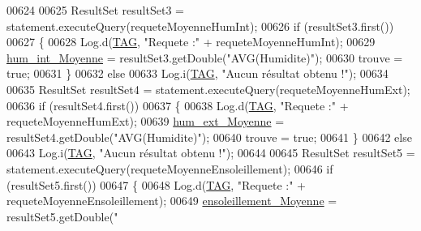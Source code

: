 \begin{DoxyCode}
00624 
00625                         ResultSet resultSet3 = statement.executeQuery(requeteMoyenneHumInt);
00626                         \textcolor{keywordflow}{if} (resultSet3.first())
00627                         \{
00628                             Log.d(\hyperlink{classfr_1_1campus_1_1laurainc_1_1honeybee_1_1_ruche_a44739cbb0fa7451c1edc240a3f51c257}{TAG}, \textcolor{stringliteral}{"Requete :"} + requeteMoyenneHumInt);
00629                             \hyperlink{classfr_1_1campus_1_1laurainc_1_1honeybee_1_1_ruche_a8edae192f1f8c4578d321f4b2129cc8a}{hum\_int\_Moyenne} = resultSet3.getDouble(\textcolor{stringliteral}{"AVG(Humidite)"});
00630                             trouve = \textcolor{keyword}{true};
00631                         \}
00632                         \textcolor{keywordflow}{else}
00633                             Log.i(\hyperlink{classfr_1_1campus_1_1laurainc_1_1honeybee_1_1_ruche_a44739cbb0fa7451c1edc240a3f51c257}{TAG}, \textcolor{stringliteral}{"Aucun résultat obtenu !"});
00634 
00635                         ResultSet resultSet4 = statement.executeQuery(requeteMoyenneHumExt);
00636                         \textcolor{keywordflow}{if} (resultSet4.first())
00637                         \{
00638                             Log.d(\hyperlink{classfr_1_1campus_1_1laurainc_1_1honeybee_1_1_ruche_a44739cbb0fa7451c1edc240a3f51c257}{TAG}, \textcolor{stringliteral}{"Requete :"} + requeteMoyenneHumExt);
00639                             \hyperlink{classfr_1_1campus_1_1laurainc_1_1honeybee_1_1_ruche_ad1f2d0608c7cbb7689254ef4ee70942a}{hum\_ext\_Moyenne} = resultSet4.getDouble(\textcolor{stringliteral}{"AVG(Humidite)"});
00640                             trouve = \textcolor{keyword}{true};
00641                         \}
00642                         \textcolor{keywordflow}{else}
00643                             Log.i(\hyperlink{classfr_1_1campus_1_1laurainc_1_1honeybee_1_1_ruche_a44739cbb0fa7451c1edc240a3f51c257}{TAG}, \textcolor{stringliteral}{"Aucun résultat obtenu !"});
00644 
00645                         ResultSet resultSet5 = statement.executeQuery(requeteMoyenneEnsoleillement);
00646                         \textcolor{keywordflow}{if} (resultSet5.first())
00647                         \{
00648                             Log.d(\hyperlink{classfr_1_1campus_1_1laurainc_1_1honeybee_1_1_ruche_a44739cbb0fa7451c1edc240a3f51c257}{TAG}, \textcolor{stringliteral}{"Requete :"} + requeteMoyenneEnsoleillement);
00649                             \hyperlink{classfr_1_1campus_1_1laurainc_1_1honeybee_1_1_ruche_af3da6a0f98d377ec6633f40a8c0e5c99}{ensoleillement\_Moyenne} = resultSet5.getDouble(\textcolor{stringliteral}{"
}
\end{DoxyCode}
